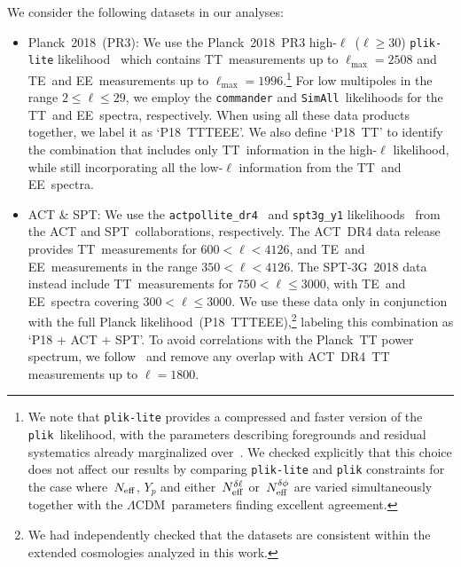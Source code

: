 We consider the following datasets in our analyses:
\begin{itemize}
	\item Planck~2018~(PR3): We use the Planck~2018~PR3 high-$\ell$~($\ell\geq 30$) \texttt{plik-lite} likelihood~\cite{Planck:2019nip} which contains TT~measurements up to $\ell_\mathrm{max}=2508$ and TE~and EE~measurements up to $\ell_\mathrm{max}=1996$.\footnote{We note that \texttt{plik-lite} provides a compressed and faster version of the \texttt{plik}~likelihood, with the parameters describing foregrounds and residual systematics already marginalized over~\cite{Planck:2019nip}. We checked explicitly that this choice does not affect our results by comparing \texttt{plik-lite} and \texttt{plik} constraints for the case where~$N_\mathrm{eff}$, $Y_p$ and either~$N_\mathrm{eff}^{\delta\ell}$ or~$N_\mathrm{eff}^{\delta\phi}$ are varied simultaneously together with the $\Lambda$CDM~parameters finding excellent agreement.} For low multipoles in the range $2 \leq \ell \leq 29$, we employ the \texttt{commander} and \texttt{SimAll}~likelihoods for the TT~and EE~spectra, respectively. When using all these data products together, we label it as `P18~TTTEEE'. We also define `P18~TT' to identify the combination that includes only TT~information in the high-$\ell$ likelihood, while still incorporating all the low-$\ell$ information from the TT~and EE~spectra.
	
	\item ACT \& SPT: We use the \texttt{actpollite\_dr4}~\cite{ACT:2020frw} and \texttt{spt3g\_y1} likelihoods~\cite{SPT-3G:2022hvq} from the ACT and SPT~collaborations, respectively. The ACT~DR4 data release provides TT~measurements for $600 < \ell < 4126$, and TE~and EE~measurements in the range $350 < \ell < 4126$. The SPT-3G~2018 data instead include TT~measurements for $750 < \ell \leq 3000$, with TE~and EE~spectra covering $300 < \ell \leq 3000$. We use these data only in conjunction with the full Planck likelihood~(P18~TTTEEE),\footnote{We had independently checked that the datasets are consistent within the extended cosmologies analyzed in this work.} labeling this combination as `P18 + ACT + SPT'. To avoid correlations with the Planck~TT power spectrum, we follow~\cite{ACT:2020frw} and remove any overlap with ACT~DR4~TT measurements up to $\ell = 1800$.
	

\end{itemize}
